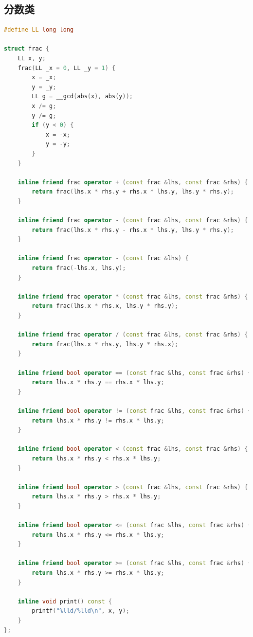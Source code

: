\documentclass{article}
\begin{document}
\subsection{分数类}

\begin{lstlisting}[language=C++]
#define LL long long

struct frac {
	LL x, y;
	frac(LL _x = 0, LL _y = 1) {
		x = _x;
		y = _y;
		LL g = __gcd(abs(x), abs(y));
		x /= g;
		y /= g;
		if (y < 0) {
			x = -x;
			y = -y;
		}
	}

	inline friend frac operator + (const frac &lhs, const frac &rhs) {
		return frac(lhs.x * rhs.y + rhs.x * lhs.y, lhs.y * rhs.y);
	}

	inline friend frac operator - (const frac &lhs, const frac &rhs) {
		return frac(lhs.x * rhs.y - rhs.x * lhs.y, lhs.y * rhs.y);
	}

	inline friend frac operator - (const frac &lhs) {
		return frac(-lhs.x, lhs.y);
	}

	inline friend frac operator * (const frac &lhs, const frac &rhs) {
		return frac(lhs.x * rhs.x, lhs.y * rhs.y);
	}

	inline friend frac operator / (const frac &lhs, const frac &rhs) {
		return frac(lhs.x * rhs.y, lhs.y * rhs.x);
	}

	inline friend bool operator == (const frac &lhs, const frac &rhs) {
		return lhs.x * rhs.y == rhs.x * lhs.y;
	}

	inline friend bool operator != (const frac &lhs, const frac &rhs) {
		return lhs.x * rhs.y != rhs.x * lhs.y;
	}

	inline friend bool operator < (const frac &lhs, const frac &rhs) {
		return lhs.x * rhs.y < rhs.x * lhs.y;
	}

	inline friend bool operator > (const frac &lhs, const frac &rhs) {
		return lhs.x * rhs.y > rhs.x * lhs.y;
	}

	inline friend bool operator <= (const frac &lhs, const frac &rhs) {
		return lhs.x * rhs.y <= rhs.x * lhs.y;
	}

	inline friend bool operator >= (const frac &lhs, const frac &rhs) {
		return lhs.x * rhs.y >= rhs.x * lhs.y;
	}

	inline void print() const {
		printf("%lld/%lld\n", x, y);
	}
};
\end{lstlisting}
\end{document}
